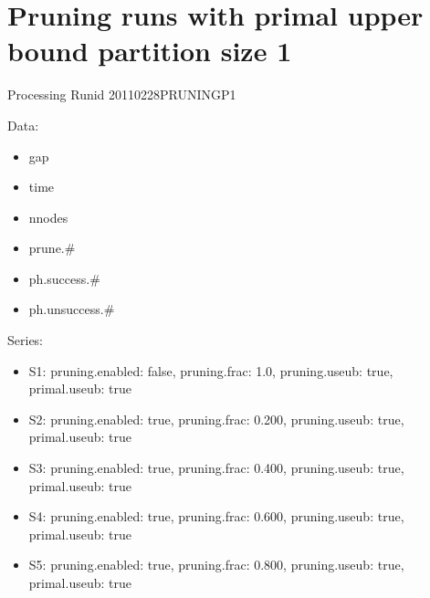\documentclass[landscape, 12pt]{report}
\begin{document}
\clearpage

\section{Pruning runs with primal upper bound partition size 1}

Processing Runid 20110228PRUNINGP1

Data:
\begin{itemize}
\item gap
\item time
\item nnodes
\item prune.\#
\item ph.success.\#
\item ph.unsuccess.\#
\end{itemize}
Series:
\begin{itemize}
\item S1: pruning.enabled: false, pruning.frac: 1.0, pruning.useub: true, primal.useub: true
\item S2: pruning.enabled: true, pruning.frac: 0.200, pruning.useub: true, primal.useub: true
\item S3: pruning.enabled: true, pruning.frac: 0.400, pruning.useub: true, primal.useub: true
\item S4: pruning.enabled: true, pruning.frac: 0.600, pruning.useub: true, primal.useub: true
\item S5: pruning.enabled: true, pruning.frac: 0.800, pruning.useub: true, primal.useub: true
\end{itemize}
\end{document}
